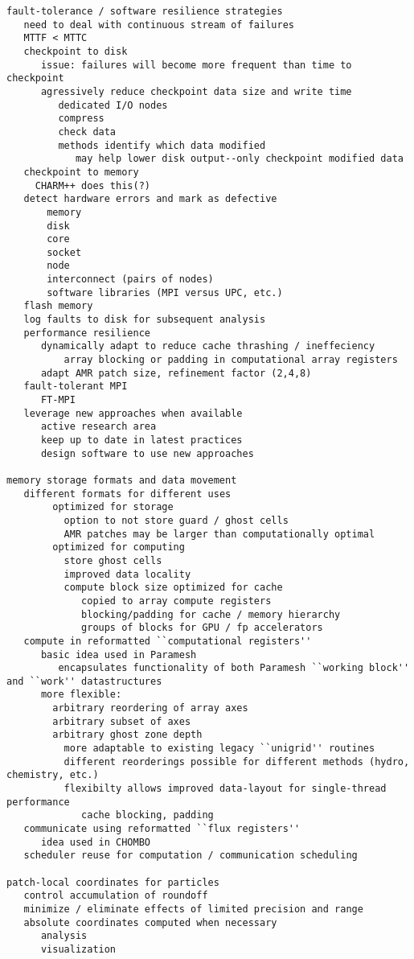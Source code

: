 \documentclass[14pt]{article}
\begin{document}
\begin{verbatim}
fault-tolerance / software resilience strategies
   need to deal with continuous stream of failures
   MTTF < MTTC
   checkpoint to disk
      issue: failures will become more frequent than time to checkpoint
      agressively reduce checkpoint data size and write time
         dedicated I/O nodes
         compress
         check data
         methods identify which data modified
            may help lower disk output--only checkpoint modified data
   checkpoint to memory
     CHARM++ does this(?)
   detect hardware errors and mark as defective
       memory
       disk
       core
       socket
       node
       interconnect (pairs of nodes)
       software libraries (MPI versus UPC, etc.)
   flash memory
   log faults to disk for subsequent analysis
   performance resilience
      dynamically adapt to reduce cache thrashing / ineffeciency
          array blocking or padding in computational array registers
      adapt AMR patch size, refinement factor (2,4,8)
   fault-tolerant MPI
      FT-MPI
   leverage new approaches when available
      active research area
      keep up to date in latest practices
      design software to use new approaches

memory storage formats and data movement
   different formats for different uses
        optimized for storage
          option to not store guard / ghost cells
          AMR patches may be larger than computationally optimal
        optimized for computing
          store ghost cells
          improved data locality
          compute block size optimized for cache
             copied to array compute registers
             blocking/padding for cache / memory hierarchy
             groups of blocks for GPU / fp accelerators
   compute in reformatted ``computational registers''
      basic idea used in Paramesh
         encapsulates functionality of both Paramesh ``working block'' and ``work'' datastructures
      more flexible:
        arbitrary reordering of array axes
        arbitrary subset of axes
        arbitrary ghost zone depth
          more adaptable to existing legacy ``unigrid'' routines
          different reorderings possible for different methods (hydro, chemistry, etc.)
          flexibilty allows improved data-layout for single-thread performance
             cache blocking, padding
   communicate using reformatted ``flux registers''
      idea used in CHOMBO
   scheduler reuse for computation / communication scheduling

patch-local coordinates for particles
   control accumulation of roundoff
   minimize / eliminate effects of limited precision and range
   absolute coordinates computed when necessary
      analysis
      visualization


\end{verbatim}
\end{document}
